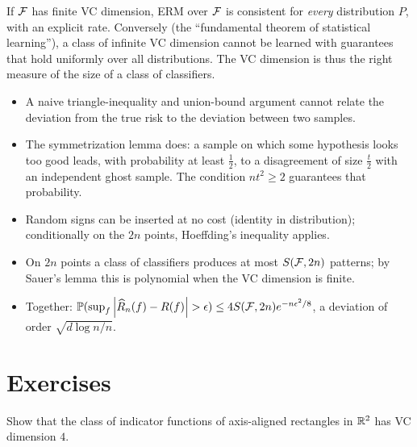 \begin{notechapter}
\begin{keyidea}[Learnability]
If $\mathcal{F}$ has finite VC dimension, ERM over $\mathcal{F}$ is consistent for
\emph{every} distribution $P$, with an explicit rate. Conversely (the
``fundamental theorem of statistical learning''), a class of infinite VC
dimension cannot be learned with guarantees that hold uniformly over all
distributions. The VC dimension is thus the right measure of the size of a
class of classifiers.
\end{keyidea}

\begin{chaptersummary}
\begin{itemize}[nosep]
  \item A naive triangle-inequality and union-bound argument cannot relate
        the deviation from the true risk to the deviation between two samples.
  \item The symmetrization lemma does: a sample on which some hypothesis
        looks too good leads, with probability at least $\frac12$, to a
        disagreement of size $\frac t2$ with an independent ghost sample. The
        condition $nt^2\geq2$ guarantees that probability.
  \item Random signs can be inserted at no cost (identity in distribution);
        conditionally on the $2n$ points, Hoeffding's inequality applies.
  \item On $2n$ points a class of classifiers produces at most $S(\mathcal{F},2n)$
        patterns; by Sauer's lemma this is polynomial when the VC dimension is
        finite.
  \item Together: $\Prob(\sup_f\abs{\ERisk(f)-\Risk(f)}>\epsilon)\leq4S(\Hs,2n)e^{-n\epsilon^2/8}$,
        a deviation of order $\sqrt{d\log n/n}$.
\end{itemize}
\end{chaptersummary}

\section*{Exercises}

\begin{exercise}\label{symmetrization-lemma:exr:1}
Show that the class of indicator functions of axis-aligned rectangles in
$\mathbb{R}^2$ has VC dimension $4$.
\end{exercise}


\end{notechapter}
